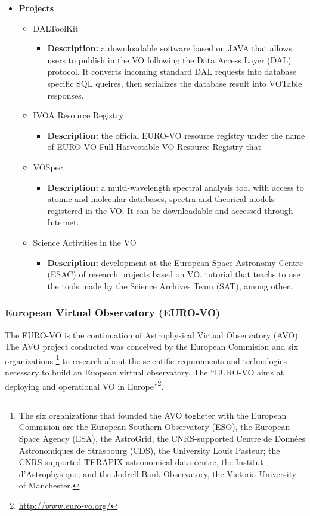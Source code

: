 \begin{itemize}
\item \textbf{Projects}
\begin{itemize}
\item DALToolKit
\begin{itemize}
\item \textbf{Description:} a downloadable software based on JAVA that allows
users to publish in the VO following the Data Access Layer (DAL) protocol. It
converts incoming standard DAL requests into database specific SQL queires, then
serializes the database result into VOTable responses. 
\end{itemize}
\item IVOA Resource Registry
\begin{itemize}
\item \textbf{Description:} the official EURO-VO resource registry under the
name of EURO-VO Full Harvestable VO Resource Registry that 
\end{itemize}
\item VOSpec
\begin{itemize}
\item \textbf{Description:} a multi-wavelength spectral analysis tool with
access to atomic and molecular databases, spectra and theorical models
registered in the VO. It can be downloadable and accessed through Internet.
\end{itemize}
\item Science Activities in the VO
\begin{itemize}
\item \textbf{Description:} development at the European Space Astronomy Centre
(ESAC) of research projects based on VO, tutorial that teachs to use the tools
made by the Science Archives Team (SAT), among other.
\end{itemize}
\end{itemize}
\end{itemize}

\subsubsection{European Virtual Observatory (EURO-VO)}
The EURO-VO is the continuation of Astrophysical Virtual Observatory (AVO). The
AVO project conducted was conceived by the European Commision and six
organizations \footnote{The six organizations that founded the AVO togheter with
the European Commision are the European Southern Observatory (ESO), the European
Space Agency (ESA), the AstroGrid, the CNRS-supported Centre de Données
Astronomiques de Strasbourg (CDS), the University Louis Pasteur; the
CNRS-supported TERAPIX astronomical data centre, the Institut d'Astrophysique;
and the Jodrell Bank Observatory, the Victoria University of Manchester.} to
research about the scientific requirements and technologies necessary to build
an Euopean virtual observatory. The ``EURO-VO aims at deploying and operational
VO in Europe''\footnote{\url{http://www.euro-vo.org/}}.\\

